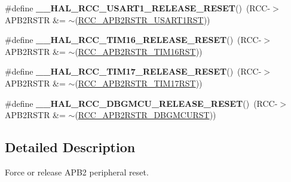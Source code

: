 \begin{DoxyCompactItemize}
\item 
\mbox{\label{group___r_c_c___a_p_b2___force___release___reset_ga243061674e38d05d222697046d43813a}} 
\#define {\bfseries \+\_\+\+\_\+\+H\+A\+L\+\_\+\+R\+C\+C\+\_\+\+U\+S\+A\+R\+T1\+\_\+\+R\+E\+L\+E\+A\+S\+E\+\_\+\+R\+E\+S\+ET}()~(R\+CC-\/$>$A\+P\+B2\+R\+S\+TR \&= $\sim$(\hyperlink{group___peripheral___registers___bits___definition_gae7ae8e338b3b42ad037e9e5b6eeb2c41}{R\+C\+C\+\_\+\+A\+P\+B2\+R\+S\+T\+R\+\_\+\+U\+S\+A\+R\+T1\+R\+ST}))
\item 
\mbox{\label{group___r_c_c___a_p_b2___force___release___reset_gaccce3b7168e4357d179cb5c978a7bfe6}} 
\#define {\bfseries \+\_\+\+\_\+\+H\+A\+L\+\_\+\+R\+C\+C\+\_\+\+T\+I\+M16\+\_\+\+R\+E\+L\+E\+A\+S\+E\+\_\+\+R\+E\+S\+ET}()~(R\+CC-\/$>$A\+P\+B2\+R\+S\+TR \&= $\sim$(\hyperlink{group___peripheral___registers___bits___definition_ga90337e162315ad0d44c0b99dd9cc71c2}{R\+C\+C\+\_\+\+A\+P\+B2\+R\+S\+T\+R\+\_\+\+T\+I\+M16\+R\+ST}))
\item 
\mbox{\label{group___r_c_c___a_p_b2___force___release___reset_ga48ebe709fd10e1594c70752a05644a85}} 
\#define {\bfseries \+\_\+\+\_\+\+H\+A\+L\+\_\+\+R\+C\+C\+\_\+\+T\+I\+M17\+\_\+\+R\+E\+L\+E\+A\+S\+E\+\_\+\+R\+E\+S\+ET}()~(R\+CC-\/$>$A\+P\+B2\+R\+S\+TR \&= $\sim$(\hyperlink{group___peripheral___registers___bits___definition_gafc7f1df686835ef47013b29e8e37a1c1}{R\+C\+C\+\_\+\+A\+P\+B2\+R\+S\+T\+R\+\_\+\+T\+I\+M17\+R\+ST}))
\item 
\mbox{\label{group___r_c_c___a_p_b2___force___release___reset_ga7877d0686f800a9374499abbddbda159}} 
\#define {\bfseries \+\_\+\+\_\+\+H\+A\+L\+\_\+\+R\+C\+C\+\_\+\+D\+B\+G\+M\+C\+U\+\_\+\+R\+E\+L\+E\+A\+S\+E\+\_\+\+R\+E\+S\+ET}()~(R\+CC-\/$>$A\+P\+B2\+R\+S\+TR \&= $\sim$(\hyperlink{group___peripheral___registers___bits___definition_gaa2c5549f45a276072b498095f8a6ee45}{R\+C\+C\+\_\+\+A\+P\+B2\+R\+S\+T\+R\+\_\+\+D\+B\+G\+M\+C\+U\+R\+ST}))
\end{DoxyCompactItemize}


\subsection{Detailed Description}
Force or release A\+P\+B2 peripheral reset. 

